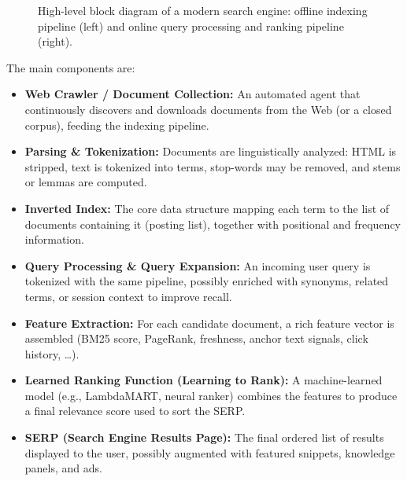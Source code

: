 \begin{figure}[H]
\caption{High-level block diagram of a modern search engine: offline indexing pipeline (left) and online query processing and ranking pipeline (right).}
\label{fig:arch-en}
\end{figure}

The main components are:

\begin{itemize}
    \item \textbf{Web Crawler / Document Collection:} An automated agent that continuously discovers and downloads documents from the Web (or a closed corpus), feeding the indexing pipeline.
    \item \textbf{Parsing \& Tokenization:} Documents are linguistically analyzed: HTML is stripped, text is tokenized into terms, stop-words may be removed, and stems or lemmas are computed.
    \item \textbf{Inverted Index:} The core data structure mapping each term to the list of documents containing it (posting list), together with positional and frequency information.
    \item \textbf{Query Processing \& Query Expansion:} An incoming user query is tokenized with the same pipeline, possibly enriched with synonyms, related terms, or session context to improve recall.
    \item \textbf{Feature Extraction:} For each candidate document, a rich feature vector is assembled (BM25 score, PageRank, freshness, anchor text signals, click history, \dots).
    \item \textbf{Learned Ranking Function (Learning to Rank):} A machine-learned model (e.g., LambdaMART, neural ranker) combines the features to produce a final relevance score used to sort the SERP.
    \item \textbf{SERP (Search Engine Results Page):} The final ordered list of results displayed to the user, possibly augmented with featured snippets, knowledge panels, and ads.
\end{itemize}

